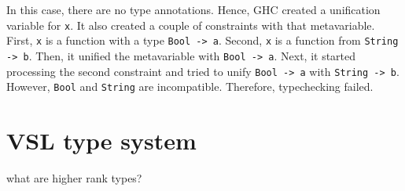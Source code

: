 In this case, there are no type annotations.
Hence, GHC created a unification variable for \texttt{x}.
It also created a couple of constraints with that metavariable.
First, \texttt{x} is a function with a type \texttt{Bool -> a}.
Second, \texttt{x} is a function from \texttt{String -> b}.
Then, it unified the metavariable with \texttt{Bool -> a}.
Next, it started processing the second constraint and tried to unify \texttt{Bool -> a} with \texttt{String -> b}.
However, \texttt{Bool} and \texttt{String} are incompatible.
Therefore, typechecking failed.


\section{VSL type system}
\label{chap:DesignImplementation:sec:VslTypeSystem}


what are higher rank types?

\newpage


\newcommand{\Qquad}{\hspace{0.25em}}
\newcommand{\mexp}[1]{\mathnormal{#1}}
\newcommand{\msyn}[1]{\normalfont\asciifamily\text{#1}}
\newcommand{\mlg}[1]{\mathlarger{\mathlarger{#1}}}

